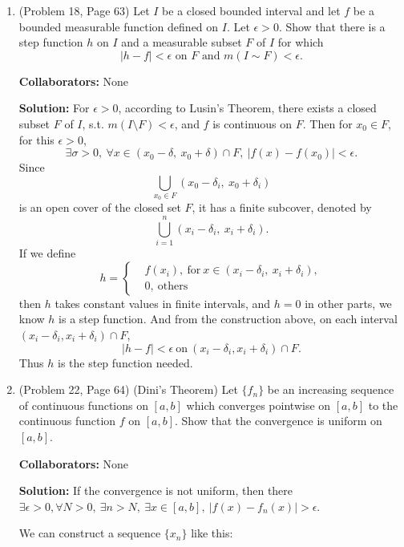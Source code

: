\documentclass{article}%
\begin{document}
\begin{enumerate}
\item  (Problem 18, Page 63) Let $I$ be a closed bounded interval and let $f$ be a bounded measurable function defined on $I$. Let $\epsilon > 0$.  Show that there is a step function $h$ on $I$ and a measurable subset $F$ of $I$ for which \[
|h-f|< \epsilon \text{ on } F \text{ and } m(I\sim F)< \epsilon .\]


\bigskip
\textbf{Collaborators:} None
\smallskip
 
\textbf{Solution:}
For $\epsilon > 0$, according to Lusin's Theorem, there exists a closed subset $F$ of $I$, s.t. $m(I\setminus F) < \epsilon$, and $f$ is continuous on $F$. 
Then for $x_0\in F$, for this $\epsilon > 0$, 
$$
\exists \sigma > 0, ~\forall x\in (x_0-\delta, ~x_0+\delta)\cap F, ~|f(x)-f(x_0)| < \epsilon.
$$
Since
$$
\bigcup_{x_0\in F} (x_0-\delta_i, ~x_0+\delta_i)
$$
is an open cover of the closed set $F$, it has a finite subcover, denoted by
$$
\bigcup_{i=1}^n (x_i-\delta_i, ~x_i+\delta_i).
$$
If we define
$$
h = \left\{
\begin{aligned}
&f(x_i), ~\text{for} ~x\in (x_i-\delta_i, ~x_i+\delta_i), \\
&0, ~\text{others}
\end{aligned}
\right.
$$
then $h$ takes constant values in finite intervals, and $h = 0$ in other parts, we know $h$ is a step function. And from the construction above, on each interval $(x_i-\delta_i, x_i+\delta_i)\cap F$, 
$$
|h-f|< \epsilon ~\text{on}~ (x_i-\delta_i, x_i+\delta_i)\cap F.
$$
Thus $h$ is the step function needed.

\bigskip

\item (Problem 22, Page 64) (Dini's Theorem)  Let $\{f_n\}$ be an increasing sequence of continuous functions on $[a,b]$ which converges pointwise on $[a,b]$ to the continuous function $f$ on $[a,b]$.  Show that the convergence is uniform on $[a,b]$.


\bigskip
\textbf{Collaborators:} None
\smallskip
 
\textbf{Solution:}
If the convergence is not uniform, then there $\exists \epsilon > 0, \forall N > 0, ~\exists n > N, ~\exists x\in [a, b], ~|f(x)-f_n(x)| > \epsilon $.

We can construct a sequence $\{x_n\}$ like this:


\end{enumerate}
\end{document}
